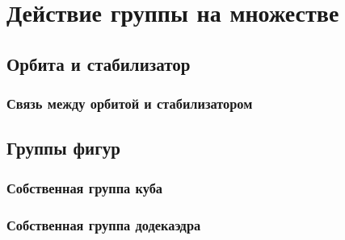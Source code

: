 \section{Действие группы на множестве}
\subsection{Орбита и стабилизатор}
\subsubsection{Связь между орбитой и стабилизатором}

\subsection{Группы фигур}
\subsubsection{Собственная группа куба}
\subsubsection{Собственная группа додекаэдра}
